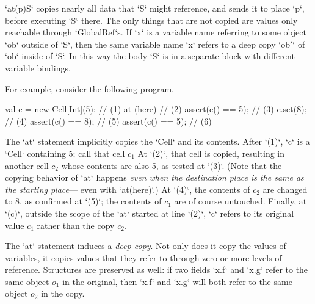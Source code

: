 \xcd`at(p)S` copies nearly all data that \xcd`S` might reference, and sends it
to place \xcd`p`, before executing \xcd`S` there. The only things that are not
copied are values only reachable through \xcd`GlobalRef`s.    If \xcd`x` is a
variable name referring to some object \xcd`ob` outside of \xcd`S`, then the
same variable name \xcd`x` refers to a deep copy \xcd`ob{$'$}` of \xcd`ob`
inside of \xcd`S`.  In this way the body \xcd`S` is in a separate block with
different variable bindings.

For example, consider the following program.
\begin{xten}
val c = new Cell[Int](5); // (1)
at (here) {               // (2)
   assert(c() == 5);      // (3)
   c.set(8);              // (4)
   assert(c() == 8);      // (5)
}
assert(c() == 5);         // (6)
\end{xten}
The \xcd`at` statement implicitly copies the \xcd`Cell` and its contents.  
After \xcd`(1)`, \xcd`c` is a \xcd`Cell` containing 5; call that cell {$c_1$}
At \xcd`(2)`, that cell is copied, resulting in another cell {$c_2$} whose
contents are also 5, as tested at \xcd`(3)`.
(Note that the copying behavior of \xcd`at` happens {\em even when the
destination place is the same as the starting place}--- even with
\xcd`at(here)`.)
At \xcd`(4)`, the contents of {$c_2$} are changed to 8, as confirmed at \xcd`(5)`; the contents of
{$c_1$} are of course untouched.    Finally, at \xcd`(c)`, outside the scope
of the \xcd`at` started at line \xcd`(2)`, \xcd`c` refers to its original
value {$c_1$} rather than the copy {$c_2$}.  

The \xcd`at` statement induces a {\em deep copy}.  Not only does it copy the
values of variables, it copies values that they refer to through zero or more
levels of reference.  Structures are preserved as well: if two fields
\xcd`x.f` and \xcd`x.g` refer to the same object {$o_1$} in the original, then
\xcd`x.f` and \xcd`x.g` will both refer to the same object {$o_2$} in the
copy.  

